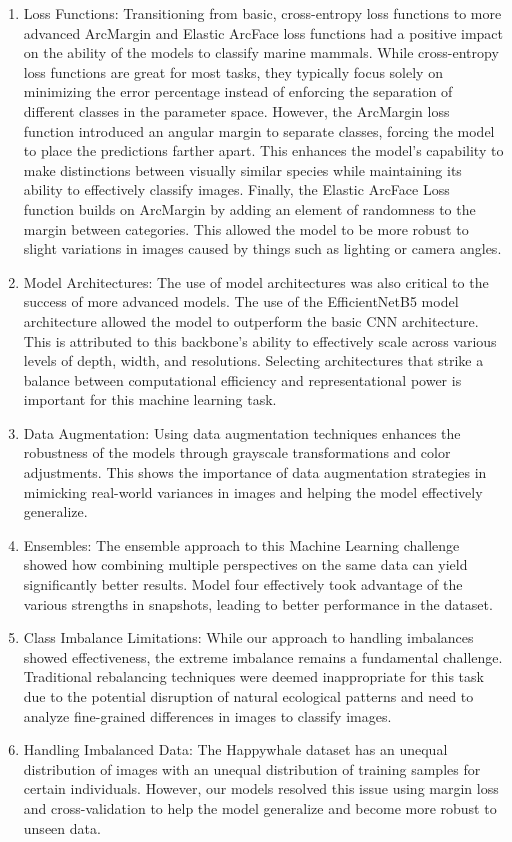 \documentclass[twocolumn]{article}
\begin{document}
\begin{enumerate}
    \item Loss Functions: Transitioning from basic, cross-entropy loss functions to more advanced ArcMargin and Elastic ArcFace loss functions had a positive impact on the ability of the models to classify marine mammals. While cross-entropy loss functions are great for most tasks, they typically focus solely on minimizing the error percentage instead of enforcing the separation of different classes in the parameter space. However, the ArcMargin loss function introduced an angular margin to separate classes, forcing the model to place the predictions farther apart. This enhances the model's capability to make distinctions between visually similar species while maintaining its ability to effectively classify images. Finally, the Elastic ArcFace Loss function builds on ArcMargin by adding an element of randomness to the margin between categories. This allowed the model to be more robust to slight variations in images caused by things such as lighting or camera angles. 
    \item Model Architectures: The use of model architectures was also critical to the success of more advanced models. The use of the EfficientNetB5 model architecture allowed the model to outperform the basic CNN architecture. This is attributed to this backbone's ability to effectively scale across various levels of depth, width, and resolutions. Selecting architectures that strike a balance between computational efficiency and representational power is important for this machine learning task.
    \item Data Augmentation: Using data augmentation techniques enhances the robustness of the models through grayscale transformations and color adjustments. This shows the importance of data augmentation strategies in mimicking real-world variances in images and helping the model effectively generalize. 
    \item Ensembles: The ensemble approach to this Machine Learning challenge showed how combining multiple perspectives on the same data can yield significantly better results. Model four effectively took advantage of the various strengths in snapshots, leading to better performance in the dataset.
    \item Class Imbalance Limitations: While our approach to handling imbalances showed effectiveness, the extreme imbalance remains a fundamental challenge. Traditional rebalancing techniques were deemed inappropriate for this task due to the potential disruption of natural ecological patterns and need to analyze fine-grained differences in images to classify images. 
    \item Handling Imbalanced Data: The Happywhale dataset has an unequal distribution of images with an unequal distribution of training samples for certain individuals. However, our models resolved this issue using margin loss and cross-validation to help the model generalize and become more robust to unseen data.
\end{enumerate}
\end{document}
